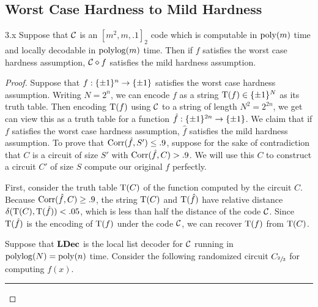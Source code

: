 \documentclass[11pt]{article}
\begin{document}
\subsection{Worst Case Hardness to Mild Hardness}

\newpage

\begin{theorem}{3.x}
    Suppose that $\mathcal{C}$ is an $[m^2, m, .1]_2$ code which is computable in $\mathrm{poly}(m)$ time and locally decodable in $\mathrm{polylog} (m)$ time. Then if $f$ satisfies the worst case hardness assumption, $\mathcal{C} \diamond f$ satisfies the mild hardness assumption.
\end{theorem}

\begin{proof}
    Suppose that $f : \{\pm 1\}^n \rightarrow \{\pm 1\}$ satisfies the worst case hardness assumption. Writing $N = 2^n$, we can encode $f$ as a string $\mathrm{T}(f) \in \{\pm 1\}^{N}$ as its truth table. Then encoding $\mathrm{T}(f)$ using $\mathcal{C}$ to a string of length $N^2 = 2^{2n}$, we get can view this as a truth table for a function $\hat{f} : \{\pm 1\}^{2n} \rightarrow \{\pm 1\}$. We claim that if $f$ satisfies the worst case hardness assumption, $\hat{f}$ satisfies the mild hardness assumption. To prove that $\mathrm{Corr}(\hat{f}, S') \leq .9$, suppose for the sake of contradiction that $C$ is a circuit of size $S'$ with $\mathrm{Corr}(\hat{f}, C) > .9$. We will use this $C$ to construct a circuit $C'$ of size $S$ compute our original $f$ perfectly.

    First, consider the truth table $\mathrm{T}(C)$ of the function computed by the circuit $C$. Because $\mathrm{Corr}(\hat{f}, C) \geq .9$, the string $\mathrm{T}(C)$ and $\mathrm{T}(\hat{f})$ have relative distance $\delta(\mathrm{T}(C), \mathrm{T}(\hat{f})) < .05$, which is less than half the distance of the code $\mathcal{C}$. Since $\mathrm{T}(\hat{f})$ is the encoding of $\mathrm{T}(f)$ under the code $\mathcal{C}$, we can recover $\mathrm{T}(f)$ from $\mathrm{T}(C)$.

    Suppose that $\text{\textbf{LDec}}$ is the local list decoder for $\mathcal{C}$ running in $\mathrm{polylog}(N) = \mathrm{poly}(n)$ time. Consider the following randomized circuit $C_{\sfrac{2}{3}}$ for computing $f(x)$.\\

    \hrule 

    \parbox{.4\linewidth}{%
        \begin{center}
\end{center}}
\end{proof}
\end{document}
